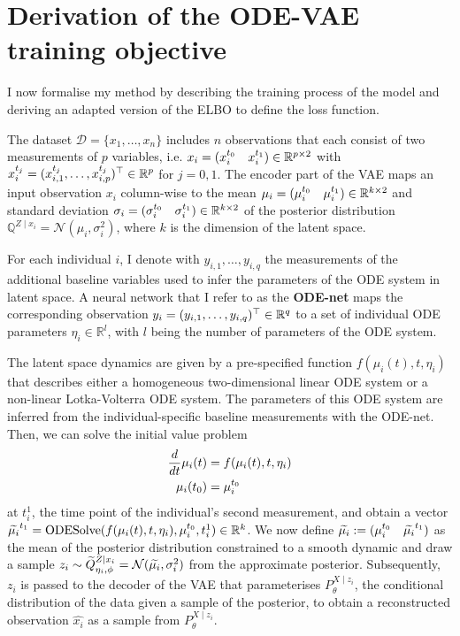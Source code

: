 \section{Derivation of the ODE-VAE training objective}\label{sec:methods-ODE-VAEtraining}

I now formalise my method by describing the training process of the model and deriving an adapted version of the ELBO to define the loss function. 

The dataset $\mathcal{D} = \lbrace x_1,\dots, x_n\rbrace$ includes $n$ observations that each consist of two measurements of $p$ variables, i.e. $x_i = (x_i^{t_0} \quad x_i^{t_1}) \in \mathbb{R}^{p\times 2}$ with $x_i^{t_j}= (x_{i,1}^{t_j}, \dots, x_{i,p}^{t_j})^{\top} \in \mathbb{R}^{p}$ for $j=0,1$.
The encoder part of the VAE maps an input observation $x_i$ column-wise to the mean  $\mu_i= (\mu_i^{t_0} \quad \mu_i^{t_1}) \in \mathbb{R}^{k\times 2}$ and standard deviation $\sigma_i = (\sigma_i^{t_0} \quad \sigma_i^{t_1}) \in \mathbb{R}^{k\times 2}$ of the posterior distribution $\mathbb{Q}^{Z\mid x_i} = \mathcal{N}(\mu_i,\sigma_i^2)$, where $k$ is the dimension of the latent space.

For each individual $i$, I denote with $y_{i,1},\dots, y_{i,q}$ the measurements of the additional baseline variables used to infer the parameters of the ODE system in latent space. A neural network that I refer to as the \textbf{ODE-net} maps the corresponding observation $y_i = (y_{i,1}, \dots, y_{i,q})^{\top} \in \mathbb{R}^q$ to a set of individual ODE parameters $\eta_i \in \mathbb{R}^l$, with $l$ being the number of parameters of the ODE system. 

The latent space dynamics are given by a pre-specified function $f(\mu_i(t), t, \eta_i)$ that describes either a homogeneous two-dimensional linear ODE system or a non-linear Lotka-Volterra ODE system. 
The parameters of this ODE system are inferred from the individual-specific baseline measurements with the ODE-net.
Then, we can solve the initial value problem 
\begin{equation*}
\begin{split}
	\frac{d}{dt} \mu_i(t) &= f(\mu_i(t), t, \eta_i)\\
	\mu_i(t_0) &= \mu_i^{t_0}
\end{split}
\end{equation*}
at $t_i^{1}$, the time point of the individual's second measurement, and obtain a vector $\widetilde{\mu_i}^{t_1} = \mathrm{ODESolve}(f(\mu_i(t), t, \eta_i), \mu_i^{t_0}, t_i^{1}) \in \mathbb{R}^k$. We now define $\widetilde{\mu_i} := (\mu_i^{t_0} \quad \widetilde{\mu_i}^{t_1})$ as the mean of the posterior distribution constrained to a smooth dynamic and draw a sample $z_i\sim \widetilde{Q}^{Z\mid x_i}_{\eta_i,\phi} = \mathcal{N}(\widetilde{\mu_i}, \sigma_i^2)$ from the approximate posterior. Subsequently, $z_i$ is passed to the decoder of the VAE that parameterises $P_{\theta}^{X\mid z_i}$, the conditional distribution of the data given a sample of the posterior, to obtain a reconstructed observation $\widehat{x_i}$ as a sample from $P_{\theta}^{X\mid z_i}$. 

